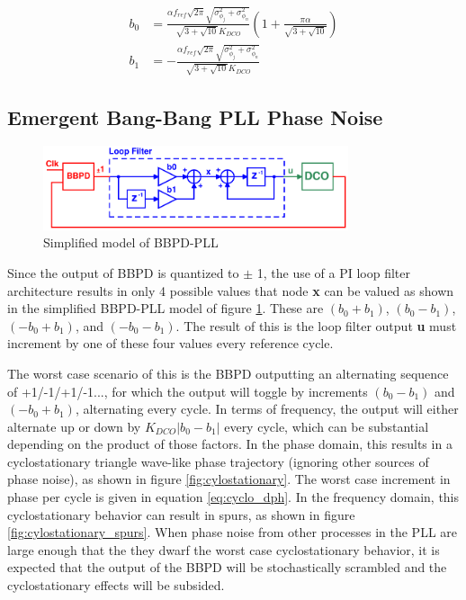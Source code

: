 			\begin{align}
				b_0 &= \frac{\alpha f_{ref}\sqrt{2\pi}\sqrt{\sigma^2_{\phi_j} + \sigma^2_{\phi_n}}}{\sqrt{3+\sqrt{10}}K_{DCO}} \left(1+\frac{\pi\alpha}{\sqrt{3+\sqrt{10}}}\right)\label{eq:b0_}\\
				 b_1 &= - \frac{\alpha f_{ref}\sqrt{2\pi}\sqrt{\sigma^2_{\phi_j} + \sigma^2_{\phi_n}}}{\sqrt{3+\sqrt{10}}K_{DCO}}\label{eq:b1_}
			\end{align}


			\FloatBarrier\subsection{Emergent Bang-Bang PLL Phase Noise}%

		\begin{figure}
			\center\includegraphics[width=0.8\textwidth, angle=0]{./figs/design/simplified_bbpll}
			\caption{Simplified model of BBPD-PLL}
			\label{fig:simp_bbpdpll}
		\end{figure}
		Since the output of BBPD is quantized to $\pm$ 1, the use of a PI loop filter architecture results in only 4 possible values that node {\color{blue}\textbf{x}} can be valued as shown in the simplified BBPD-PLL model of figure \ref{fig:simp_bbpdpll}. These are $(b_0+b_1)$, $(b_0-b_1)$, $(-b_0+b_1)$, and $(-b_0-b_1)$. The result of this is the loop filter output {\color{teal}\textbf{u}} must increment by one of these four values every reference cycle. 

		The worst case scenario of this is the BBPD outputting an alternating sequence of +1/-1/+1/-1..., for which the output will toggle by increments $(b_0-b_1 )$ and $(-b_0+b_1)$, alternating every cycle. In terms of frequency, the output will either alternate up or down by $K_{DCO}| b_0-b_1 |$ every cycle, which can be substantial depending on the product of those factors. In the phase domain, this results in a cyclostationary triangle wave-like phase trajectory (ignoring other sources of phase noise), as shown in figure \ref{fig:cylostationary}. The worst case increment in phase per cycle is given in equation \ref{eq:cyclo_dph}. In the frequency domain, this cyclostationary behavior can result in spurs, as shown in figure \ref{fig:cylostationary_spurs}. When phase noise from other processes in the PLL are large enough that the they dwarf the worst case cyclostationary behavior, it is expected that the output of the BBPD will be stochastically scrambled and the cyclostationary effects will be subsided. 

